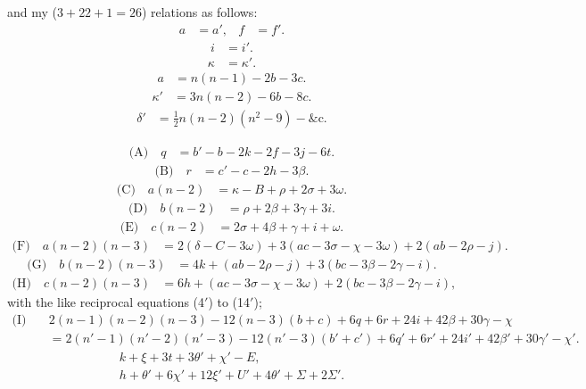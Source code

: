 \documentclass[11pt,a4paper]{article}
\theoremstyle{plain}
\theoremstyle{definition}
\theoremstyle{remark}
\begin{document}
\newpage
\setcounter{page}{627}

and my ($3+22+1=26$) relations as follows:
\begin{align*}
a &= a', & f &= f'.\tag{1}
\end{align*}
\begin{align*}
i &= i'.\tag{2}
\end{align*}
\begin{align*}
\kappa &= \kappa'.\tag{3}
\end{align*}
\begin{align*}
a &= n(n-1)-2b-3c.\tag{4}
\end{align*}
\begin{align*}
\kappa' &= 3n(n-2)-6b-8c.\tag{5}
\end{align*}
\begin{align*}
\delta' &= \tfrac{1}{2}n(n-2)(n^2-9)-\text{\&c.}\tag{6}
\end{align*}

\begin{align*}
\text{(A)}\quad q &= b'-b-2k-2f-3j-6t.\tag{13}
\end{align*}
\begin{align*}
\text{(B)}\quad r &= c'-c-2h-3\beta.\tag{14}
\end{align*}
\begin{align*}
\text{(C)}\quad a(n-2) &= \kappa-B+\rho+2\sigma+3\omega.\tag{7}
\end{align*}
\begin{align*}
\text{(D)}\quad b(n-2) &= \rho+2\beta+3\gamma+3i.\tag{8}
\end{align*}
\begin{align*}
\text{(E)}\quad c(n-2) &= 2\sigma+4\beta+\gamma+i+\omega.\tag{9}
\end{align*}
\begin{align*}
\text{(F)}\quad a(n-2)(n-3) &= 2(\delta-C-3\omega)+3(ac-3\sigma-\chi-3\omega)+2(ab-2\rho-j).\tag{10}
\end{align*}
\begin{align*}
\text{(G)}\quad b(n-2)(n-3) &= 4k+(ab-2\rho-j)+3(bc-3\beta-2\gamma-i).\tag{11}
\end{align*}
\begin{align*}
\text{(H)}\quad c(n-2)(n-3) &= 6h+(ac-3\sigma-\chi-3\omega)+2(bc-3\beta-2\gamma-i),\tag{12}
\end{align*}
with the like reciprocal equations (4$'$) to (14$'$);
\begin{align*}
\text{(I)}\quad &2(n-1)(n-2)(n-3)-12(n-3)(b+c)+6q+6r+24i+42\beta+30\gamma-\chi\\
&=2(n'-1)(n'-2)(n'-3)-12(n'-3)(b'+c')+6q'+6r'+24i'+42\beta'+30\gamma'-\chi'.\tag{26}
\end{align*}
\begin{align*}
k+\xi+3t+3\theta'+\chi'-E,\\
h+\theta'+6\chi'+12\xi'+U'+4\theta'+\Sigma+2\Sigma'.
\end{align*}
\end{document}
